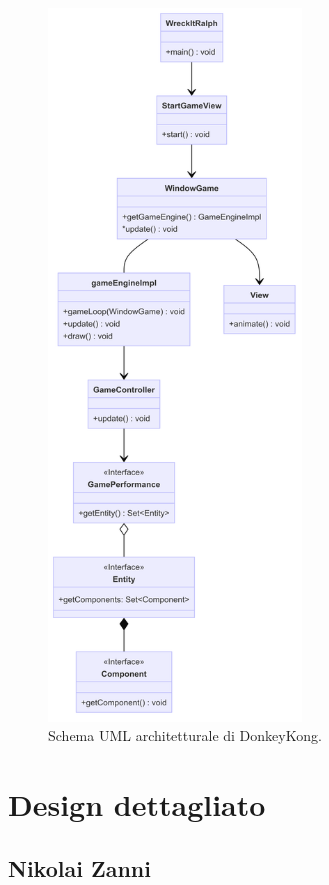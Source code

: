 \documentclass[a4paper,12pt]{report}
\begin{document}
\begin{figure}[H]
\centering{}
\includegraphics[width=0.6\textwidth]{img/architettura.png}
\caption{Schema UML architetturale di DonkeyKong.}
\label{img:architettura}
\end{figure}

\section{Design dettagliato}
\subsection{Nikolai Zanni}
\end{document}
